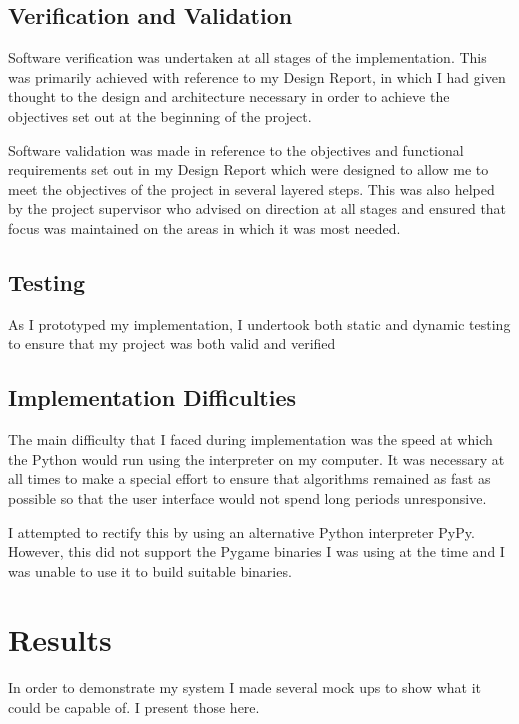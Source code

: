 \documentclass[12pt,a4paper]{article}
\begin{document}
\subsection{Verification and Validation}

Software verification was undertaken at all stages of the implementation. This was primarily achieved with reference to my Design Report, in which I had given thought to the design and architecture necessary in order to achieve the objectives set out at the beginning of the project.

Software validation was made in reference to the objectives and functional requirements set out in my Design Report which were designed to allow me to meet the objectives of the project in several layered steps. This was also helped by the project supervisor who advised on direction at all stages and ensured that focus was maintained on the areas in which it was most needed.

\subsection{Testing}

As I prototyped my implementation, I undertook both static and dynamic testing to ensure that my project was both valid and verified 

\subsection{Implementation Difficulties}

The main difficulty that I faced during implementation was the speed at which the Python would run using the interpreter on my computer. It was necessary at all times to make a special effort to ensure that algorithms remained as fast as possible so that the user interface would not spend long periods unresponsive.

I attempted to rectify this by using an alternative Python interpreter PyPy. However, this did not support the Pygame binaries I was using at the time and I was unable to use it to build suitable binaries.

\section{Results}

In order to demonstrate my system I made several mock ups to show what it could be capable of. I present those here.
\end{document}
